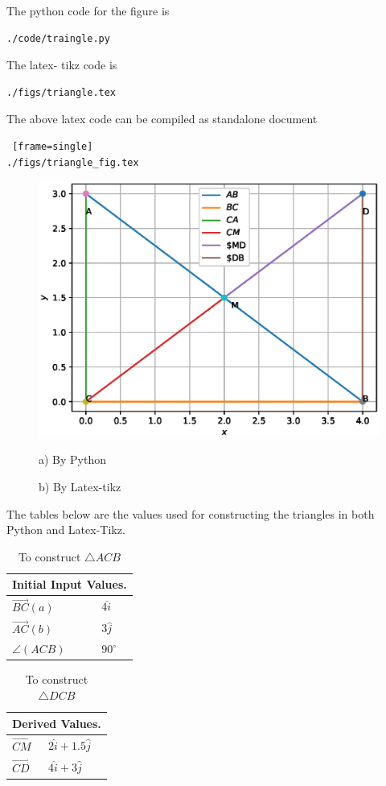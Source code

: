 
\begin{flushleft}
The python code for the figure is
\begin{lstlisting}[frame=single]
./code/traingle.py
\end{lstlisting}
The latex- tikz code is
\begin{lstlisting}[frame=single]
./figs/triangle.tex
\end{lstlisting}
The above latex code can be compiled as standalone document
\begin{lstlisting} [frame=single]
./figs/triangle_fig.tex
\end{lstlisting}
\end{flushleft}
\begin{figure}[H]
\includegraphics[scale=0.4]{./figs/triangle.eps}
\caption*{a) By Python}
%

\caption*{b) By Latex-tikz}
%
\end{figure}
The tables below are the values used for constructing the triangles in both Python and Latex-Tikz.
\begin{table}[H]
\centering
\begin{tabular}{ |p{3cm}|p{3cm}|  }
\hline
 \multicolumn{2}{|c|}{Initial Input Values.} \\
\hline
$\vec{BC}(a)$ & $4\hat{i}$\\
\hline
$\vec{AC}(b)$ & $3\hat{j}$\\
\hline
$\angle(ACB)$ & $90^{\circ}$ \\
\hline
\end{tabular}
\caption*{To construct $\triangle ACB$}
\end{table}

\begin{table}[H]
\centering
\begin{tabular}{ |p{3cm}|p{3cm}|  }
\hline
 \multicolumn{2}{|c|}{Derived Values.} \\
\hline
$\vec{CM}$ & $2\hat{i}+1.5\hat{j}$\\
\hline
$\vec{CD}$ & $4\hat{i}+3\hat{j}$\\
\hline
\end{tabular}
\caption*{To construct $\triangle DCB$}
\end{table}